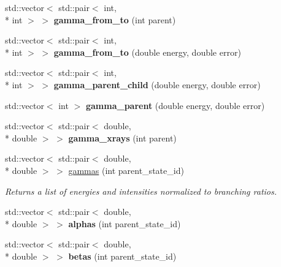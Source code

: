 \begin{DoxyCompactItemize}
\item 
\hypertarget{namespacepyne_ab7c78ce8ef6b2242b1b91e4b044b75b1}{std\-::vector$<$ std\-::pair$<$ int, \\*
int $>$ $>$ {\bfseries gamma\-\_\-from\-\_\-to} (int parent)}\label{namespacepyne_ab7c78ce8ef6b2242b1b91e4b044b75b1}

\item 
\hypertarget{namespacepyne_aadaed97b885de370c1a7361a39079021}{std\-::vector$<$ std\-::pair$<$ int, \\*
int $>$ $>$ {\bfseries gamma\-\_\-from\-\_\-to} (double energy, double error)}\label{namespacepyne_aadaed97b885de370c1a7361a39079021}

\item 
\hypertarget{namespacepyne_ab57180e1e9e791ab2480cd4875f6330c}{std\-::vector$<$ std\-::pair$<$ int, \\*
int $>$ $>$ {\bfseries gamma\-\_\-parent\-\_\-child} (double energy, double error)}\label{namespacepyne_ab57180e1e9e791ab2480cd4875f6330c}

\item 
\hypertarget{namespacepyne_a94e4481d01e0d9c2f3d34a11ccdd0e4f}{std\-::vector$<$ int $>$ {\bfseries gamma\-\_\-parent} (double energy, double error)}\label{namespacepyne_a94e4481d01e0d9c2f3d34a11ccdd0e4f}

\item 
\hypertarget{namespacepyne_a0453b68ad87cb9ca636a24000f45c3e6}{std\-::vector$<$ std\-::pair$<$ double, \\*
double $>$ $>$ {\bfseries gamma\-\_\-xrays} (int parent)}\label{namespacepyne_a0453b68ad87cb9ca636a24000f45c3e6}

\item 
std\-::vector$<$ std\-::pair$<$ double, \\*
double $>$ $>$ \hyperlink{namespacepyne_a8eeb397c67e950ae3b78c02a6a09655b}{gammas} (int parent\-\_\-state\-\_\-id)
\begin{DoxyCompactList}\small\item\em Returns a list of energies and intensities normalized to branching ratios. \end{DoxyCompactList}\item 
\hypertarget{namespacepyne_afab6c1fd5c10dd2582c242fc04296e0f}{std\-::vector$<$ std\-::pair$<$ double, \\*
double $>$ $>$ {\bfseries alphas} (int parent\-\_\-state\-\_\-id)}\label{namespacepyne_afab6c1fd5c10dd2582c242fc04296e0f}

\item 
\hypertarget{namespacepyne_af2c502044eaf54a9b575f66f0e38daa3}{std\-::vector$<$ std\-::pair$<$ double, \\*
double $>$ $>$ {\bfseries betas} (int parent\-\_\-state\-\_\-id)}\label{namespacepyne_af2c502044eaf54a9b575f66f0e38daa3}


\end{DoxyCompactItemize}
